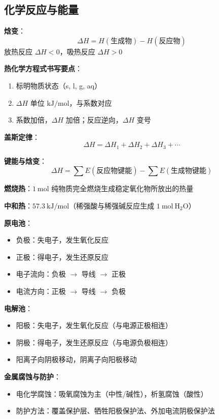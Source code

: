 \subsection{化学反应与能量}

\textbf{焓变}：
\[
\Delta H = H(\text{生成物}) - H(\text{反应物})
\]
放热反应 $\Delta H < 0$，吸热反应 $\Delta H > 0$

\textbf{热化学方程式书写要点}：
\begin{enumerate}
  \item 标明物质状态（s, l, g, aq）
  \item $\Delta H$ 单位 $\text{kJ/mol}$，与系数对应
  \item 系数加倍，$\Delta H$ 加倍；反应逆向，$\Delta H$ 变号
\end{enumerate}

\textbf{盖斯定律}：
\[
\Delta H = \Delta H_1 + \Delta H_2 + \Delta H_3 + \cdots
\]

\textbf{键能与焓变}：
\[
\Delta H = \sum E(\text{反应物键能}) - \sum E(\text{生成物键能})
\]

\textbf{燃烧热}：$1\ \text{mol}$ 纯物质完全燃烧生成稳定氧化物所放出的热量

\textbf{中和热}：$57.3\ \text{kJ/mol}$（稀强酸与稀强碱反应生成 $1\ \text{mol}\ \text{H}_2\text{O}$）

\textbf{原电池}：
\begin{itemize}
  \item 负极：失电子，发生氧化反应
  \item 正极：得电子，发生还原反应
  \item 电子流向：负极 $\to$ 导线 $\to$ 正极
  \item 电流方向：正极 $\to$ 导线 $\to$ 负极
\end{itemize}

\textbf{电解池}：
\begin{itemize}
  \item 阳极：失电子，发生氧化反应（与电源正极相连）
  \item 阴极：得电子，发生还原反应（与电源负极相连）
  \item 阳离子向阴极移动，阴离子向阳极移动
\end{itemize}

\textbf{金属腐蚀与防护}：
\begin{itemize}
  \item 电化学腐蚀：吸氧腐蚀为主（中性/碱性），析氢腐蚀（酸性）
  \item 防护方法：覆盖保护层、牺牲阳极保护法、外加电流阴极保护法
\end{itemize}

